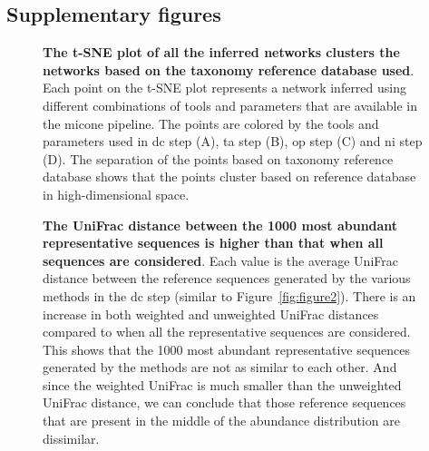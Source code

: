   \subsection*{Supplementary figures}

    \begin{figure}[H]
      \centering
        \caption{
          \textbf{The t-SNE plot of all the inferred networks clusters the networks based on the taxonomy reference database used}.
          Each point on the t-SNE plot represents a network inferred using different combinations of tools and parameters that are available in the \ac{micone} pipeline.
          The points are colored by the tools and parameters used in \ac{dc} step (A), \ac{ta} step (B), \ac{op} step (C) and \ac{ni} step (D).
          The separation of the points based on taxonomy reference database shows that the points cluster based on reference database in high-dimensional space.
        }
      \label{fig:figure_s1}
    \end{figure}

    \begin{figure}[H]
      \centering
        \caption{
          \textbf{The UniFrac distance between the 1000 most abundant representative sequences is higher than that when all sequences are considered}.
          Each value is the average UniFrac distance between the reference sequences generated by the various methods in the \ac{dc} step (similar to Figure~\ref{fig:figure2}).
          There is an increase in both weighted and unweighted UniFrac distances compared to when all the representative sequences are considered.
          This shows that the 1000 most abundant representative sequences generated by the methods are not as similar to each other.
          And since the weighted UniFrac is much smaller than the unweighted UniFrac distance, we can conclude that those reference sequences that are present in the middle of the abundance distribution are dissimilar.
        }
      \label{fig:figure_s2}
    \end{figure}

